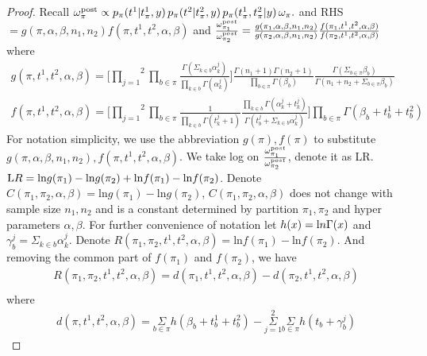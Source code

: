 \documentclass[aoas,preprint]{imsart}
\begin{document}
\begin{proof}
Recall $ \omega^{\rm post}_\pi \propto 
 p_\pi(t^1 | t^1_{\pi},y)\, p_\pi(t^2|  t^2_{\pi},y )
 \, p_\pi( t^1_{\pi}, t^2_{\pi} | y ) \, \omega_\pi.$
 and RHS $=  g(\pi, \alpha, \beta, n_1, n_2) f(\pi, t^1, t^2, \alpha, \beta)$ and $\frac{\omega_{\pi_1}^{\text post}}{\omega_{\pi_2}^{\text post}} = \frac{g(\pi_1, \alpha, \beta, n_1, n_2)}{g(\pi_2, \alpha, \beta, n_1, n_2)}\frac{f(\pi_1, t^1, t^2, \alpha, \beta)}{f(\pi_2, t^1, t^2, \alpha, \beta)}$
 where \begin{eqnarray*}
 g(\pi, t^1, t^2, \alpha, \beta) = \big[ \overset{2}{\underset{j = 1}{\prod}}\underset{b\in \pi}\prod \frac{\Gamma(\Sigma_{k\in b} \alpha_k^j)}{\prod_{k\in b} \Gamma(\alpha_k^j)} \big ] \frac{\Gamma(n_1 + 1) \Gamma(n_2 + 1)}{\prod_{b\in \pi} \Gamma(\beta_b)} \frac{\Gamma(\Sigma_{b \in \pi} \beta_b)}{\Gamma(n_1 + n_2 + \Sigma_{b\in\pi} \beta_b)}\\
f(\pi, t^1, t^2, \alpha, \beta) = \big[ \overset{2}{\underset{j = 1}{\prod}}\underset{b\in \pi}\prod \frac{1}{\prod_{k \in b}\Gamma(t_k^j + 1)}\frac{\prod_{k \in b}\Gamma(\alpha_k^j + t_k^j)}{\Gamma(t_b^j + \Sigma_{k\in b}\alpha_k^j)}\big ] \underset{b\in \pi}\prod \Gamma(\beta_b + t_b^1 + t_b^2) 
\end{eqnarray*}
For notation simplicity, we use the abbreviation $g(\pi), f(\pi)$ to substitute $g(\pi, \alpha, \beta, n_1, n_2),f(\pi, t^1, t^2, \alpha, \beta)$.  We take log on $\frac{\omega_{\pi_1}^{\text post}}{\omega_{\pi_2}^{\text post}}$, denote it as LR. $\text LR = \text{ln}g(\pi_1) - \text{ln}g(\pi_2) + \text{ln}f(\pi_1) - \text{ln}f(\pi_2)$. Denote $C(\pi_1, \pi_2, \alpha, \beta) = \text{ln}g(\pi_1) - \text{ln}g(\pi_2)$, $C(\pi_1, \pi_2, \alpha, \beta)$ does not change with sample size $n_1, n_2$ and is a constant determined by partition $\pi_1, \pi_2$ and hyper parameters $\alpha, \beta$.  For further convenience of notation let $h(x) = \text ln\Gamma(x)$ and $\gamma_b^j = \Sigma_{k\in b} \alpha_k^j$. Denote $R(\pi_1, \pi_2, t^1, t^2, \alpha, \beta) = \text{ln}f(\pi_1) - \text{ln}f(\pi_2)$. And removing the common part of $f(\pi_1)$ and $f(\pi_2)$, we have 
\begin{eqnarray*}
R(\pi_1, \pi_2, t^1, t^2, \alpha, \beta) = d(\pi_1, t^1, t^2, \alpha, \beta) - d(\pi_2, t^1, t^2, \alpha, \beta)\\
\end{eqnarray*}
where
\begin{eqnarray*}
d(\pi, t^1, t^2, \alpha, \beta) = \underset{b\in \pi}\Sigma h(\beta_b + t_b^1 + t_b^2) - \overset{2}{\underset{j = 1}{\Sigma}} \underset{b\in \pi}\Sigma h(t_b + \gamma_b^j)
\end{eqnarray*}



\end{proof}
\end{document}
